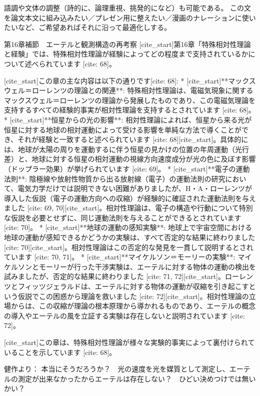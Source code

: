 \documentclass{article}
\begin{document}
語調や文体の調整（詩的に、論理重視、挑発的になど）も可能である。
この文を論文本文に組み込みたい／プレゼン用に整えたい／漫画のナレーションに使いたいなど、ご希望あればそれに沿って最適化しする。



第16章補節　エーテルと観測構造の再考察
[cite\_start]第16章「特殊相対性理論と経験」では、特殊相対性理論が経験によってどの程度まで支持されているかについて述べられています [cite: 68]。

[cite\_start]この章の主な内容は以下の通りです[cite: 68]:
* [cite\_start]**マックスウェル＝ローレンツの理論との関連**: 特殊相対性理論は、電磁気現象に関するマックスウェル＝ローレンツの理論から発展したものであり、この電磁気理論を支持するすべての経験的事実が相対性理論を支持するとされています [cite: 68]。
* [cite\_start]**恒星からの光の影響**: 相対性理論によれば、恒星から来る光が恒星に対する地球の相対運動によって受ける影響を単純な方法で導くことができ、それが経験と一致すると述べられています [cite: 68][cite\_start]。具体的には、地球が太陽の周りを運動するに伴う恒星の見かけの位置の年周運動（光行差）と、地球に対する恒星の相対運動の視線方向速度成分が光の色に及ぼす影響（ドップラー効果）が挙げられています [cite: 69]。
* [cite\_start]**電子の運動法則**: 陰極線や放射性物質から出る放射線（電子）の運動法則の研究において、電気力学だけでは説明できない困難がありましたが、H・A・ローレンツが導入した仮説（電子の運動方向への収縮）が経験的に確証された運動法則を与えました [cite: 69, 70][cite\_start]。相対性理論は、電子の構造や行動について特別な仮説を必要とせずに、同じ運動法則を与えることができるとされています [cite: 70]。
* [cite\_start]**地球の運動の感知実験**: 地球上で宇宙空間における地球の運動が感知できるかどうかの実験は、すべて否定的な結果に終わりました [cite: 70][cite\_start]。相対性理論はこの否定的な発見を一貫して説明するとされています [cite: 70, 71]。
* [cite\_start]**マイケルソン＝モーリーの実験**: マイケルソンとモーリーが行った干渉実験は、エーテルに対する物体の運動の検出を試みましたが、否定的な結果に終わりました [cite: 71, 72][cite\_start]。ローレンツとフィッツジェラルドは、エーテルに対する物体の運動が収縮を引き起こすという仮説でこの困惑から理論を救いました [cite: 72][cite\_start]。相対性理論の立場からは、この収縮が理論の根本原理から導かれるものであり、エーテルの概念の導入やエーテルの風を立証する実験は存在しないと説明されています [cite: 72]。

[cite\_start]この章は、特殊相対性理論が様々な実験的事実によって裏付けられていることを示しています [cite: 68]。


健作より：
本当にそうだろうか？　光の速度を光を媒質として測定し、エーテルの測定が出来なかったからエーテルは存在しない？　ひどい決めつけでは無いかい？
\end{document}
